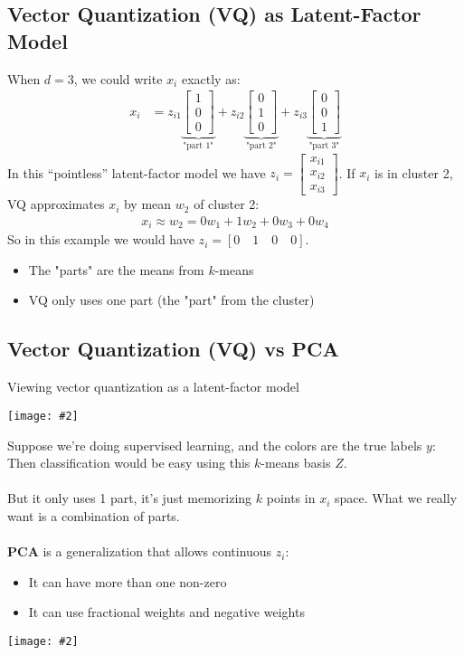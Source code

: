 \documentclass{article}
\def\blu#1{{\color{blu}#1}}
\def\gre#1{{\color{gre}#1}}
\def\red#1{{\color{red}#1}}
\newcommand{\centerfig}[2]{\begin{center}\texttt{[image: \#2]}\end{center}}
\begin{document}
\subsection*{Vector Quantization (VQ) as Latent-Factor Model}
When $ d = 3 $, we could write $ x_i $ exactly as:
\begin{align*}
x_i &= z_{i1}  \underbrace{\begin{bmatrix}
1 \\0\\0
\end{bmatrix}}_{\text{"part 1"}} + 
z_{i2}  \underbrace{\begin{bmatrix}
0 \\1\\0
\end{bmatrix}}_{\text{"part 2"}} +
z_{i3}  \underbrace{\begin{bmatrix}
0 \\0\\1
\end{bmatrix}}_{\text{"part 3"}}
\end{align*}
In this “pointless” latent-factor model we have $ z_i = \begin{bmatrix}
x_{i1} \\ x_{i2} \\ x_{i3} 
\end{bmatrix}$.
If $ x_i $ is in cluster 2, VQ approximates $ x_i $ by mean $ w_2 $ of cluster 2:
\begin{align*}
x_i \approx w_2 = 0 w_1 + 1w_2 + 0 w_3 + 0 w_4
\end{align*}
So in this example we would have $ z_i = [0 \quad 1 \quad 0 \quad 0] $. 
\begin{itemize}
	\item The \blu{"parts" are the means} from $ k $-means 
	\item \red{VQ only uses one part} (the "part" from the cluster)
\end{itemize}

\subsection*{Vector Quantization (VQ) vs PCA}
Viewing vector quantization as a \blu{latent-factor model}
\centerfig{0.8}{lat-fac-3}
Suppose we're doing supervised learning, and the colors are the true labels $ y $: \gre{Then classification would be easy using this $ k $-means basis $ Z $.} \\
\\
But it only uses 1 part, it's just memorizing $ k $ points in $ x_i $ space. What we really want is a combination of parts. \\
\\
\textbf{PCA} is a generalization that allows continuous $ z_i $:
\begin{itemize}
	\item It can have more than one non-zero
	\item It can use fractional weights and negative weights 
\end{itemize}
\centerfig{0.15}{PCA-1}
\end{document}
